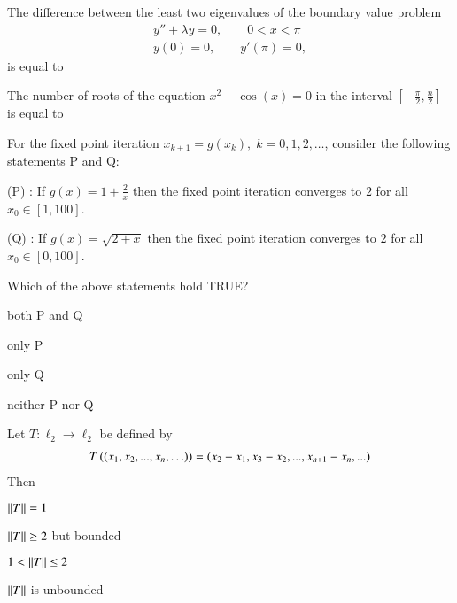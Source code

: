 \documentclass[journal]{IEEEtran}
\numberwithin{equation}{enumi}
\numberwithin{figure}{enumi}
\begin{document}
\begin{enumerate}
{\item The difference between the least two eigenvalues of the boundary value problem
\begin{align*}
y'' + \lambda y = 0, \qquad 0 < x < \pi \\
y(0) = 0, \qquad y'(\pi) = 0,
\end{align*}
is equal to \underline

\hfill{}

\item The number of roots of the equation $x^2 - \cos(x) = 0$ in the interval $\left[ -\frac{\pi}{2}, \frac{n}{2} \right]$ is equal to \underline

\hfill{}

\item For the fixed point iteration $x_{k+1} = g(x_k), \; k = 0, 1, 2, \ldots$, consider the following statements P and Q:

(P) : If $g(x) = 1 + \frac{2}{x}$ then the fixed point iteration converges to $2$ for all $x_0 \in [1, 100]$.

(Q) : If $g(x) = \sqrt{2 + x}$ then the fixed point iteration converges to $2$ for all $x_0 \in [0, 100]$.

Which of the above statements hold TRUE?

\begin{enumerate}
\begin{multicols}{2}
\item both P and Q
\item only P
\item only Q
\item neither P nor Q
\end{multicols}
\end{enumerate}

\hfill{}

\item Let $T : \ell_2 \to \ell_2$ be defined by
\begin{align*}
T\left( (x_1, x_2, ..., x_n, \ldots) \right) = (x_2 - x_1, x_3 - x_2, ..., x_{n+1} - x_n, ...)
\end{align*}
Then

\begin{enumerate}
\begin{multicols}{2}
\item $\left\lVert T\right\rVert = 1$
\item $\left\lVert T\right\rVert \geq 2$ but bounded
\item $1 < \left\lVert T\right\rVert \leq 2$
\item $\left\lVert T\right\rVert$ is unbounded
\end{multicols}
\end{enumerate}

}
\end{enumerate}
\end{document}
